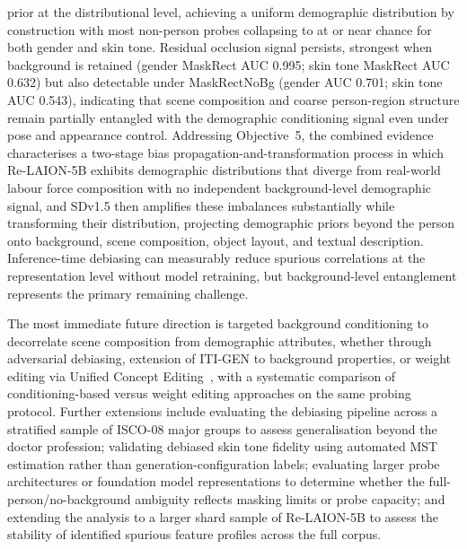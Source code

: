 prior at the distributional level, achieving a uniform demographic distribution by
construction with most non-person probes collapsing to at or near chance for both gender
and skin tone. Residual occlusion signal persists, strongest when background is retained (gender
MaskRect AUC 0.995; skin tone MaskRect AUC 0.632) but also detectable under MaskRectNoBg
(gender AUC 0.701; skin tone AUC 0.543), indicating that scene composition and coarse
person-region structure remain partially entangled with the demographic conditioning
signal even under pose and appearance control. Addressing Objective~5, the
combined evidence characterises a two-stage bias
propagation-and-transformation process in which Re-LAION-5B
exhibits demographic distributions that diverge from real-world labour force composition
with no independent background-level demographic signal, and SDv1.5 then amplifies these
imbalances substantially while transforming their distribution, projecting demographic
priors beyond the person onto background, scene composition, object layout, and textual
description. Inference-time debiasing can measurably reduce spurious correlations at the
representation level without model retraining, but background-level entanglement
represents the primary remaining challenge.

The most immediate future direction is targeted background conditioning to decorrelate
scene composition from demographic attributes, whether through adversarial debiasing,
extension of ITI-GEN to background properties, or weight editing via Unified Concept
Editing~\cite{Gandikota_2024_UCE}, with a systematic comparison of conditioning-based
versus weight editing approaches on the same probing protocol. Further extensions include
evaluating the debiasing pipeline across a stratified sample of ISCO-08 major groups to
assess generalisation beyond the doctor profession; validating debiased skin tone fidelity
using automated MST estimation rather than generation-configuration labels; evaluating
larger probe architectures or foundation model representations to determine whether the
full-person/no-background ambiguity reflects masking limits or probe capacity; and extending the
analysis to a larger shard sample of Re-LAION-5B to assess the stability of identified
spurious feature profiles across the full corpus.